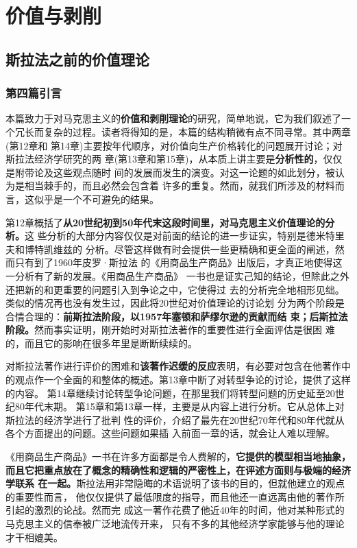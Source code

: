 \part{价值与剥削}

\chapter{斯拉法之前的价值理论}

\section{第四篇引言}

本篇致力于对马克思主义的\textbf{价值和剥削理论}的研究，简单地说，它为我们叙述了一
个冗长而复杂的过程。读者将得知的是，本篇的结构稍微有点不同寻常。其中两章(第12章和
第14章)主要按年代顺序，对价值向生产价格转化的问题展开讨论；对斯拉法经济学研究的两
章(第13章和第15章)，从本质上讲主要是\textbf{分析性的}，仅仅是附带论及这些观点随时
间的发展而发生的演变。对这一论题的如此划分，被认为是相当棘手的，而且必然会包含着
许多的重复。然而，就我们所涉及的材料而言，这似乎是一个不可避免的结果。

第12章概括了\textbf{从20世纪初到50年代末这段时间里，对马克思主义价值理论的分析。}这
些分析的大部分内容仅仅是对前面的结论的进一步证实，特别是德米特里夫和博特凯维兹的
分析。尽管这样做有时会提供一些更精确和更全面的阐述，然而只有到了1960年皮罗·斯拉法
的《用商品生产商品》出版后，才真正地使得这一分析有了新的发展。《用商品生产商品》
一书也是证实己知的结论，但除此之外还把新的和更重要的问题引入到争论之中，它使得过
去的分析完全地相形见绌。类似的情况再也没有发生过，因此将20世纪对价值理论的讨论划
分为两个阶段是合情合理的：\textbf{前斯拉法阶段，以1957年塞顿和萨缪尔逊的贡献而结
  束；后斯拉法阶段。}然而事实证明，刚开始时对斯拉法著作的重要性进行全面评估是很困
难的，而且它的影响在很多年里是断断续续的。

对斯拉法著作进行评价的困难和\textbf{该著作迟缓的反应}表明，有必要对包含在他著作中
的观点作一个全面的和整体的概述。第13章中断了对转型争论的讨论，提供了这样的内容。
第14章继续讨论转型争论问题，在那里我们将转型问题的历史延至20世纪80年代末期。
第15章和第13章一样，主要是从内容上进行分析。它从总体上对斯拉法的经济学进行了批判
性的评价，介绍了最先在20世纪70年代和80年代就从各个方面提出的问题。这些问题如果插
入前面一章的话，就会让人难以理解。

《用商品生产商品》一书在许多方面都是令人费解的，\textbf{它提供的模型相当地抽象，
  而且它把重点放在了概念的精确性和逻辑的严密性上，在评述方面则与极端的经济学联系
  在一起。}斯拉法用非常隐晦的术语说明了该书的目的，但就他建立的观点的重要性而言，
他仅仅提供了最低限度的指导，而且他还一直远离由他的著作所引起的激烈的论战。然而完
成这一著作花费了他近40年的时间，他对某种形式的马克思主义的信奉被广泛地流传开来，
只有不多的其他经济学家能够与他的理论才干相媲美。

